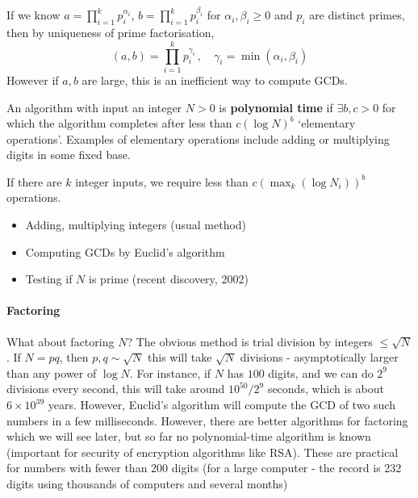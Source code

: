 \documentclass{article}
\begin{document}
If we know $a = \prod_{i=1}^k p_i^{\alpha_i}$, $b = \prod_{i=1}^k p_i^{\beta_i}$ for $\alpha_i, \beta_i \geq 0$ and $p_i$ are distinct primes, then by uniqueness of prime factorisation,
\begin{equation*}
    (a, b) = \prod_{i=1}^k p_i^{\gamma_i} \, , \quad \gamma_i = \min(\alpha_i, \beta_i)
\end{equation*}
However if $a, b$ are large, this is an inefficient way to compute GCDs.
\begin{defi}
    An algorithm with input an integer $N> 0$ is \textbf{polynomial time} if $\exists b, c > 0$ for which the algorithm completes after less than $c (\log N)^b$ `elementary operations'.
    Examples of elementary operations include adding or multiplying digits in some fixed base.

    If there are $k$ integer inputs, we require less than $c (\max_k(\log N_i))^b$ operations.
\end{defi}

\begin{eg}\leavevmode
    \begin{itemize}
        \item Adding, multiplying integers (usual method)
        \item Computing GCDs by Euclid's algorithm
        \item Testing if $N$ is prime (recent discovery, 2002)
    \end{itemize}
\end{eg}

\paragraph{Factoring} What about factoring $N$? The obvious method is trial division by integers $\leq \sqrt{N}$. If $N = pq$, then $p, q \sim \sqrt{N}$ this will take $\sqrt{N}$ divisions - asymptotically larger than any power of $\log N$.
For instance, if $N$ has $100$ digits, and we can do $2^9$ divisions every second, this will take around $10^{50} / 2^9$ seconds, which is about $6 \times 10^{39}$ years.  However, Euclid's algorithm will compute the GCD of two such numbers in a few milliseconds.
However, there are better algorithms for factoring which we will see later, but so far no polynomial-time algorithm is known (important for security of encryption algorithms like RSA).
These are practical for numbers with fewer than 200 digits (for a large computer - the record is 232 digits using thousands of computers and several months)
\end{document}
